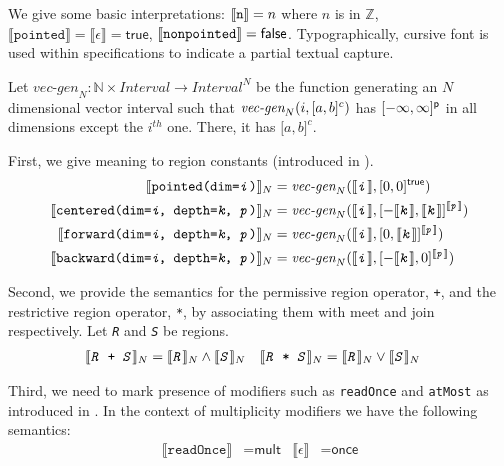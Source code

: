 \documentclass{article}
\theoremstyle{definition}
\theoremstyle{plain}
\newcommand{\interp}[1]{\llbracket\texttt{#1}\rrbracket}
\newcommand{\interv}[3]{\textnormal{$\lbrack#1,#2\rbrack^{#3}$}}
\newcommand{\vecgen}[3]{\textnormal{$\textit{vec-gen}_{#1}(#2,#3)$}}
\begin{document}
We give some basic interpretations: $\interp{\texttt{n}} = n$ where $n$ is in
$\mathbb{Z}$, $\interp{pointed} = \llbracket \epsilon \rrbracket =
\textsf{true}$, $\interp{\texttt{nonpointed}} = \textsf{false}$.
Typographically, cursive font is used within specifications to indicate a
partial textual capture.

Let $\textit{vec-gen}_N : \mathbb{N} \times \textit{Interval} \to
\textit{Interval}^N$ be the function generating an $N$ dimensional vector
interval such that \vecgen{N}{i}{\interv{a}{b}{c}} has
$\interv{-\infty}{\infty}{\textsf{p}}$ in all dimensions except the $i^{th}$
one. There, it has \interv{a}{b}{c}.

First, we give meaning to region constants (introduced in \Cref{}).
%
\begin{align*}
  \interp{\texttt{pointed(dim=\textit{i})}}_N & =
    \vecgen{N}{\interp{\textit{i}}}{\interv{0}{0}{\textsf{true}}}\\
%
  \interp{\texttt{centered(dim=\textit{i}, depth=\textit{k}, \textit{p})}}_N & =
    \vecgen{N}
           {\interp{\textit{i}}}
           {\interv{-\interp{\textit{k}}}
                   {\interp{\textit{k}}}
                   {\interp{\textit{p}}}
           } \\
%
  \interp{\texttt{forward(dim=\textit{i}, depth=\textit{k}, \textit{p})}}_N & =
    \vecgen{N}
           {\interp{\textit{i}}}
           {\interv{0}
                   {\interp{\textit{k}}}
                   {\interp{\textit{p}}}
           } \\
%
  \interp{\texttt{backward(dim=\textit{i}, depth=\textit{k}, \textit{p})}}_N & =
    \vecgen{N}
           {\interp{\textit{i}}}
           {\interv{-\interp{\textit{k}}}
                   {0}
                   {\interp{\textit{p}}}
           }
\end{align*}

Second, we provide the semantics for the permissive region operator, \texttt{+},
and the restrictive region operator, \texttt{*}, by associating them with meet
and join respectively. Let \texttt{\textit{R}} and \texttt{\textit{S}} be
regions.
%
\begin{align*}
  \interp{\texttt{\textit{R} + \textit{S}}}_N & =
    \interp{\texttt{\textit{R}}}_N \wedge \interp{\texttt{\textit{S}}}_N
&
  \interp{\texttt{\textit{R} * \textit{S}}}_N & =
    \interp{\texttt{\textit{R}}}_N \vee \interp{\texttt{\textit{S}}}_N
\end{align*}

Third, we need to mark presence of modifiers such as \texttt{readOnce} and
\texttt{atMost} as introduced in \Cref{}. In the context of
multiplicity modifiers we have the following semantics:
%
\begin{align*}
  \interp{readOnce} & = \textsf{mult} &
  \llbracket\epsilon\rrbracket & = \textsf{once}
\end{align*}
\end{document}
